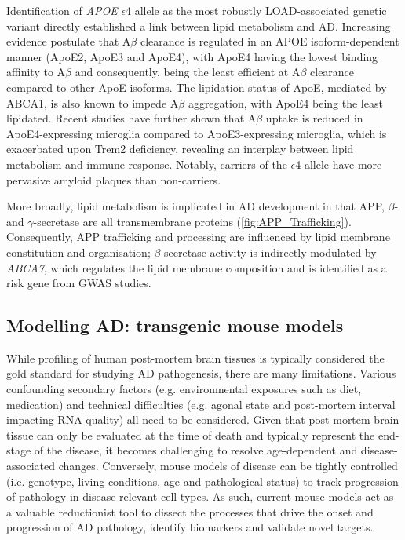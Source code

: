 \label{intro_lipid}
Identification of \textit{APOE} $\epsilon$4 allele as the most robustly LOAD-associated genetic variant directly established a link between lipid metabolism and AD. Increasing evidence postulate that A$\beta$ clearance is regulated in an APOE isoform-dependent manner (ApoE2, ApoE3 and ApoE4)\cite{Castellano2011}, with ApoE4 having the lowest binding affinity to A$\beta$ and consequently, being the least efficient at A$\beta$ clearance compared to other ApoE isoforms\cite{RM2012}. The lipidation status of ApoE, mediated by ABCA1\cite{R2010}, is also known to impede A$\beta$ aggregation, with ApoE4 being the least lipidated\cite{DM2006}. Recent studies have further shown that A$\beta$ uptake is reduced in ApoE4-expressing microglia compared to ApoE3-expressing microglia, which is exacerbated upon Trem2 deficiency, revealing an interplay between lipid metabolism and immune response\cite{Fitz2021}. Notably, carriers of the $\epsilon$4 allele have more pervasive amyloid plaques than non-carriers\cite{DE1993,E2009}.

More broadly, lipid metabolism is implicated in AD development in that APP, $\beta$- and $\gamma$-secretase are all transmembrane proteins (\cref{fig:APP_Trafficking}). Consequently, APP trafficking and processing are influenced by lipid membrane constitution and organisation\cite{DiPaolo2011}; $\beta$-secretase activity is indirectly modulated by \textit{ABCA7}, which regulates the lipid membrane composition and is identified as a risk gene from GWAS studies\cite{Sierksma2020,Sakae2016}.  


\clearpage
\subsection{Modelling AD: transgenic mouse models}
While profiling of human post-mortem brain tissues is typically considered the gold standard for studying AD pathogenesis, there are many limitations. Various confounding secondary factors (e.g. environmental exposures such as diet, medication) and technical difficulties (e.g. agonal state and post-mortem interval impacting RNA quality) all need to be considered. Given that post-mortem brain tissue can only be evaluated at the time of death and typically represent the end-stage of the disease, it becomes challenging to resolve age-dependent and disease-associated changes. Conversely, mouse models of disease can be tightly controlled (i.e. genotype, living conditions, age and pathological status) to track progression of pathology in disease-relevant cell-types. As such, current mouse models act as a valuable reductionist tool to dissect the processes that drive the onset and progression of AD pathology, identify biomarkers and validate novel targets\cite{Hall2012}.

